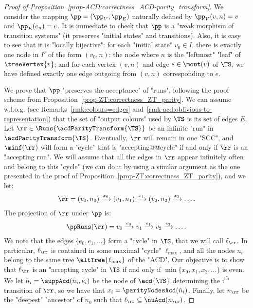 \documentclass[10pt,a4paper]{amsart}
\newcommand{\ts}{\textsuperscript}
\newcommand{\re}[1]{\xrightarrow{#1}}
\begin{document}
\begin{proof}[Proof of Proposition~\ref{prop-ACD:correctness_ACD-parity_transform}]
	We consider the mapping $\pp = (\pp_V, \pp_E)$ naturally defined by $\pp_V(v,n) = v$ and $\pp_E(e_n) = e$. 
	It is immediate to check that $\pp$ is a "weak morphism of transition systems" (it preserves "initial states" and transitions). Also, it is easy to see that it is "locally bijective": for each "initial state" $v_0\in I$, there is exactly one node in $I'$ of the form $(v_0, n)$: the node where $n$ is the "leftmost" "leaf" of $\treeVertex{v}$; and for each vertex $(v,n)$ and edge $e\in \mout(v)$ of $\TS$, we have defined exactly one edge outgoing from $(v,n)$ corresponding to $e$.
	
	We prove that $\pp$ "preserves the acceptance" of "runs", following the proof scheme from Proposition~\ref{prop-ZT:correctness_ZT_parity}. We can assume w.l.o.g. (see Remarks~\ref{rmk:colours=edges} and~\ref{rmk-acd:oblivious-to-representation}) that the set of "output colours" used by $\TS$ is its set of edges $E$.
	Let $\rr\in \Runs{\acdParityTransform{\TS}}$ be an infinite "run" in $\acdParityTransform{\TS}$. Eventually, $\rr$ will remain in one "SCC", and $\minf(\rr)$ will form a "cycle"  that is "accepting@@cycle" if and only if $\rr$ is an "accepting run".
	We will assume that all the edges in $\rr$ appear infinitely often and belong to this "cycle" (we can do it by using a similar argument as the one presented in the proof of Proposition~\ref{prop-ZT:correctness_ZT_parity}), and we let:
	\[ \rr = (v_0, n_0) \re{x_0} (v_1, n_1) \re{x_1} (v_2, n_2) \re{x_3}\dots .  \]
	The projection of $\rr$ under $\pp$ is:
	\[ \ppRuns(\rr) = v_0\re{e_0} v_1 \re{e_1} v_2 \re{e_3}\dots. \]
	We note that the edges $\{e_0, e_1, \dots \}$ form a "cycle" in $\TS$, that we will call $\ell_\rr$. In particular, $\ell_\rr$ is contained in some maximal "cycle" $\ell_{\max}$, and all the nodes $n_i$ belong to the same tree $\altTree{\ell_{\max}}$ of the "ACD".
	Our objective is to show that $\ell_\rr$ is an "accepting cycle"  in $\TS$ if and only if $\min \{x_0, x_1, x_2,\dots\}$ is even.
	We let $\tilde{n}_i = \suppAcd(n_i, e_i)$ be the node of $\acd{\TS}$ determining the i\ts{th} transition of $\rr$, so we have that $x_i = \parityNodesAcd(\tilde{n}_i)$. 
	Finally, let $n_\rr$ be the "deepest" "ancestor" of $n_0$ such that $\ell_\rr \subseteq \nuAcd(n_\rr)$.
	

\end{proof}
\end{document}
